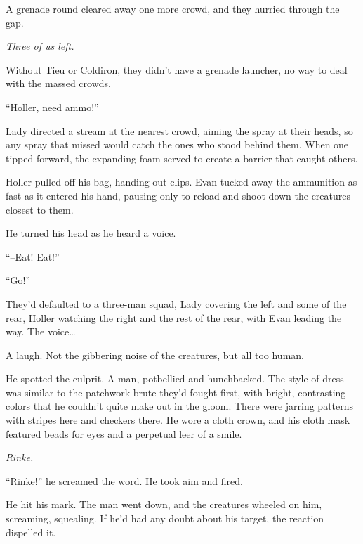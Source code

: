 A grenade round cleared away one more crowd, and they hurried through the gap.



\emph{Three of us left.}



Without Tieu or Coldiron, they didn't have a grenade launcher, no way to deal with the massed crowds.



``Holler, need ammo!''



Lady directed a stream at the nearest crowd, aiming the spray at their heads, so any spray that missed would catch the ones who stood behind them.  When one tipped forward, the expanding foam served to create a barrier that caught others.



Holler pulled off his bag, handing out clips.  Evan tucked away the ammunition as fast as it entered his hand, pausing only to reload and shoot down the creatures closest to them.



He turned his head as he heard a voice.



``--Eat!  Eat!''



``Go!''



They'd defaulted to a three-man squad, Lady covering the left and some of the rear, Holler watching the right and the rest of the rear, with Evan leading the way.  The voice\ldots



A laugh.  Not the gibbering noise of the creatures, but all too human.



He spotted the culprit.  A man, potbellied and hunchbacked.  The style of dress was similar to the patchwork brute they'd fought first, with bright, contrasting colors that he couldn't quite make out in the gloom.  There were jarring patterns with stripes here and checkers there.  He wore a cloth crown, and his cloth mask featured beads for eyes and a perpetual leer of a smile.



\emph{Rinke.}



``Rinke!'' he screamed the word.  He took aim and fired.



He hit his mark.  The man went down, and the creatures wheeled on him, screaming, squealing.  If he'd had any doubt about his target, the reaction dispelled it.




